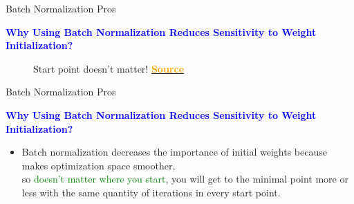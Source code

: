 \documentclass[serif, aspectratio=169]{beamer}
\begin{document}
\begin{frame}{Batch Normalization Pros}

    \textcolor{blue}{\textbf{Why Using Batch Normalization Reduces Sensitivity to Weight Initialization?}}

    \begin{figure}[h]
        \centering
        \caption{Start point doesn't matter! \href{https://www.linkedin.com/pulse/ways-improve-your-deep-learning-model-batch-adam-albuquerque-lima}{\textcolor{orange}{\textbf{Source}}}}
    \end{figure}
\end{frame}

\begin{frame}{Batch Normalization Pros}

    \textcolor{blue}{\textbf{Why Using Batch Normalization Reduces Sensitivity to Weight Initialization?}}
    \begin{itemize}

        \item Batch normalization decreases the importance of initial weights because makes optimization space smoother, \\ so \textcolor{green}{doesn’t matter where you start}, you will get to the minimal point more or less with the same quantity of iterations in every start point.


    \end{itemize}
\end{frame}
\end{document}

